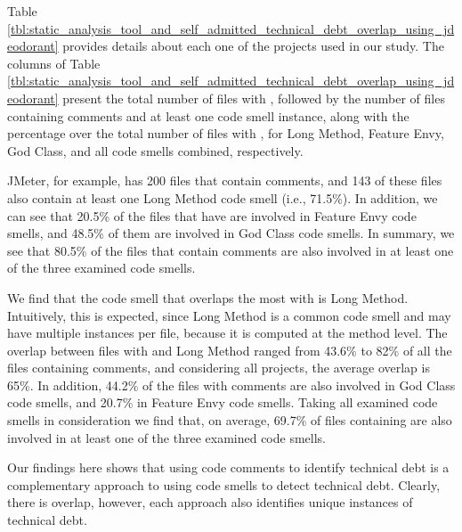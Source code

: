 Table \ref{tbl:static_analysis_tool_and_self_admitted_technical_debt_overlap_using_jdeodorant} provides details about each one of the projects used in our study. The columns of Table \ref{tbl:static_analysis_tool_and_self_admitted_technical_debt_overlap_using_jdeodorant} present the total number of files with \SATD, followed by the number of files containing \SATD comments and at least one code smell instance,
along with the percentage over the total number of files with \SATD, for Long Method, Feature Envy, God Class, and all code smells combined, respectively. 

JMeter, for example, has 200 files that contain \SATD comments, and 143 of these files also contain at least one Long Method code smell (i.e., 71.5\%). In addition, we can see that 20.5\% of the files that have \SATD are involved in Feature Envy code smells, and 48.5\% of them are involved in God Class code smells. In summary, we see that 80.5\% of the files that contain \SATD comments are also involved in at least one of the three examined code smells.     

We find that the code smell that overlaps the most with \SATD is Long Method. Intuitively, this is expected, since Long Method is a common code smell and may have multiple instances per file, because it is computed at the method level. The overlap between files with \SATD and Long Method ranged from 43.6\% to 82\% of all the files containing \SATD comments, and considering all projects, the average overlap is 65\%. In addition, 44.2\% of the files with \SATD comments are also involved in God Class code smells, and 20.7\% in Feature Envy code smells. Taking all examined code smells in consideration we find that, on average, 69.7\% of files containing \SATD are also involved in at least one of the three examined code smells. 

Our findings here shows that using code comments to identify technical debt is a complementary approach to using code smells to detect technical debt. Clearly, there is overlap, however, each approach also identifies unique instances of technical debt.

